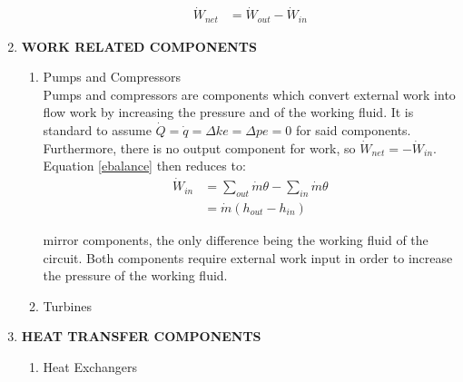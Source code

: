 \documentclass{article}
\begin{document}
\begin{enumerate}
\begin{enumerate}
\begin{equation}
\begin{aligned}
                \dot{W}_{net} &= \dot{W}_{out} - \dot{W}_{in}
            \end{aligned}
        \end{equation}
    \end{enumerate}
    \item{\bf WORK RELATED COMPONENTS}
    \begin{enumerate}
        \item{Pumps and Compressors}\\
        Pumps and compressors are components which convert external work into flow work by increasing the pressure and of the working fluid.
        It is standard to assume $\dot{Q}=\dot{q}=\Delta ke = \Delta pe = 0$ for said components. Furthermore, there is no output component for work, so
        $\dot{W}_{net} = -\dot{W}_{in}$. Equation \ref{ebalance} then reduces to:
        \begin{equation}\label{ebal_pump}
            \begin{aligned}
                \dot{W}_{in} &= \sum_{out}\dot{m}\theta-\sum_{in}\dot{m}\theta\\
                &= \dot{m}(h_{out}-h_{in})
            \end{aligned}
        \end{equation}


        mirror components, the only difference being the working fluid of the circuit.
        Both components require external work input in order to increase the pressure of the working fluid.
        \item{Turbines}
    \end{enumerate}
    \item{\bf HEAT TRANSFER COMPONENTS}
    \begin{enumerate}
        \item{Heat Exchangers}
    \end{enumerate}
\end{enumerate}
\end{document}
